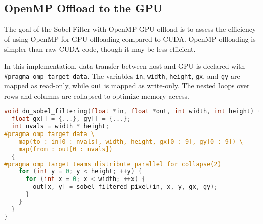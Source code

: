 \subsection{OpenMP Offload to the GPU}
\label{subsec:gpu-omp}

The goal of the Sobel Filter with OpenMP GPU offload is to assess the efficiency of using OpenMP for GPU offloading compared to CUDA. OpenMP offloading is simpler than raw CUDA code, though it may be less efficient.

In this implementation, data transfer between host and GPU is declared with \texttt{\#pragma omp target data}. The variables \texttt{in}, \texttt{width}, \texttt{height}, \texttt{gx}, and \texttt{gy} are mapped as read-only, while \texttt{out} is mapped as write-only. The nested loops over rows and columns are collapsed to optimize memory access.

\begin{lstlisting}[caption={\textbf{OpenMP offload to the GPU implementation of Sobel filtering.} \texttt{do\_sobel\_filtering()} applies the Sobel filter, parallelizing the collapsed row/column loop with OpenMP.},label={listing:sobel-gpu-omp},float=htbp,style=mystyle,language=C++]
void do_sobel_filtering(float *in, float *out, int width, int height) {
  float gx[] = {...}, gy[] = {...};
  int nvals = width * height;
#pragma omp target data \
    map(to : in[0 : nvals], width, height, gx[0 : 9], gy[0 : 9]) \
    map(from : out[0 : nvals])
  {
#pragma omp target teams distribute parallel for collapse(2)
    for (int y = 0; y < height; ++y) {
      for (int x = 0; x < width; ++x) {
        out[x, y] = sobel_filtered_pixel(in, x, y, gx, gy);
      }
    }
  }
}
\end{lstlisting}
